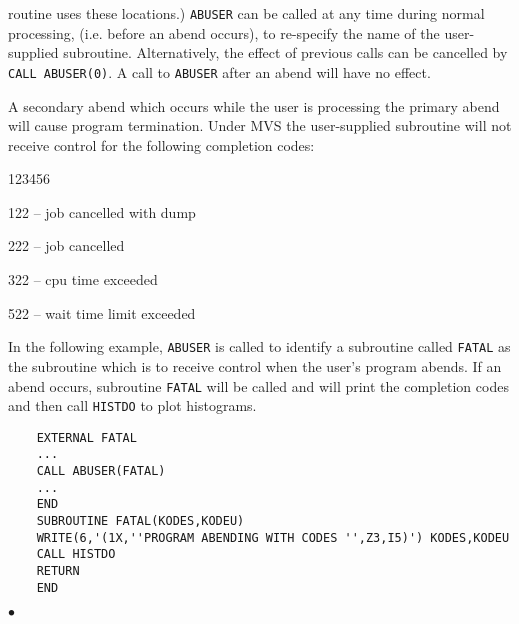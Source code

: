 routine uses these locations.)
\Notes
{\tt ABUSER} can be called at any time during normal processing,
(i.e. before an abend occurs), to re-specify the name of the
user-supplied subroutine. Alternatively, the effect of previous calls
can be cancelled by {\tt CALL ABUSER(0)}. A call to {\tt ABUSER}
after an abend will have no effect.
\par
A secondary abend which occurs while the user is processing the primary
abend will cause program termination.
\newpage
Under MVS the user-supplied subroutine will not receive control for the
following completion codes:\\
\begin{DLtt}{123456}
\item[122] -- job cancelled with dump
\item[222] -- job cancelled
\item[322] -- cpu time exceeded
\item[522] -- wait time limit exceeded
\end{DLtt}
\Examples
In the following example, {\tt ABUSER} is called to identify a subroutine
called {\tt FATAL} as the subroutine which is to receive control when the
user's program abends. If an abend occurs, subroutine {\tt FATAL} will
be called and will print the completion codes and then call {\tt HISTDO}
to plot histograms.
\begin{verbatim}
    EXTERNAL FATAL
    ...
    CALL ABUSER(FATAL)
    ...
    END
    SUBROUTINE FATAL(KODES,KODEU)
    WRITE(6,'(1X,''PROGRAM ABENDING WITH CODES '',Z3,I5)') KODES,KODEU
    CALL HISTDO
    RETURN
    END
\end{verbatim}
$\bullet$
